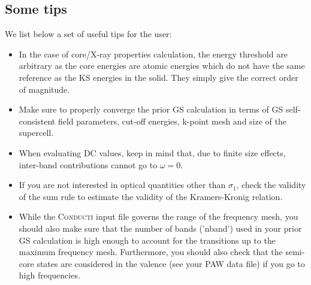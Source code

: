 \documentclass[a4,12pts]{extarticle}
\begin{document}
\subsection{Some tips}
We list below a set of useful tips for the user:
\begin{itemize}
\item In the case of core/X-ray properties calculation, the energy threshold are arbitrary as the core energies are atomic energies which do not have the same reference as the KS energies in the solid. They simply give the correct order of magnitude.
\item Make sure to properly converge the prior GS calculation in terms of GS self-consistent field parameters, cut-off energies, k-point mesh and size of the supercell.
\item When evaluating DC values, keep in mind that, due to finite size effects, inter-band contributions cannot go to $\omega=0$.
\item If you are not interested in optical quantities other than $\sigma_1$, check the validity of the sum rule to estimate the validity of the Kramers-Kronig relation.
\item While the \textsc{Conducti} input file governs the range of the frequency mesh, you should also make sure that the number of bands ('nband') used in your prior GS calculation is high enough to account for the transitions up to the maximum frequency mesh. Furthermore, you should also check that the semi-core states are considered in the valence (see your PAW data file) if you go to high frequencies.
\end{itemize}


\end{document}
